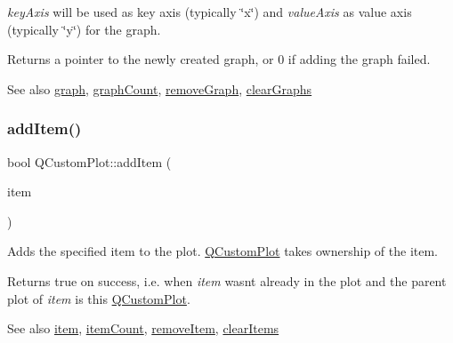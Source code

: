 {\itshape key\+Axis} will be used as key axis (typically \char`\"{}x\char`\"{}) and {\itshape value\+Axis} as value axis (typically \char`\"{}y\char`\"{}) for the graph.

Returns a pointer to the newly created graph, or 0 if adding the graph failed.

\begin{DoxySeeAlso}{See also}
\hyperlink{class_q_custom_plot_a6ecae130f684b25276fb47bd3a5875c6}{graph}, \hyperlink{class_q_custom_plot_a5e1787cdde868c4d3790f9ebc8207d90}{graph\+Count}, \hyperlink{class_q_custom_plot_a903561be895fb6528a770d66ac5e6713}{remove\+Graph}, \hyperlink{class_q_custom_plot_ab0f3abff2d2f7df3668b5836f39207fa}{clear\+Graphs} 
\end{DoxySeeAlso}
\hypertarget{class_q_custom_plot_aa500620379262321685cb7a7674cbd2a}{}\label{class_q_custom_plot_aa500620379262321685cb7a7674cbd2a} 
\subsubsection{\texorpdfstring{add\+Item()}{addItem()}}
{\footnotesize\ttfamily bool Q\+Custom\+Plot\+::add\+Item (\begin{DoxyParamCaption}\item[{\hyperlink{class_q_c_p_abstract_item}{Q\+C\+P\+Abstract\+Item} $\ast$}]{item }\end{DoxyParamCaption})}

Adds the specified item to the plot. \hyperlink{class_q_custom_plot}{Q\+Custom\+Plot} takes ownership of the item.

Returns true on success, i.\+e. when {\itshape item} wasn\textquotesingle{}t already in the plot and the parent plot of {\itshape item} is this \hyperlink{class_q_custom_plot}{Q\+Custom\+Plot}.

\begin{DoxySeeAlso}{See also}
\hyperlink{class_q_custom_plot_ac042f2e78edd228ccf2f26b7fe215239}{item}, \hyperlink{class_q_custom_plot_a16025daf0341f9362be3080e404424c2}{item\+Count}, \hyperlink{class_q_custom_plot_ae04446557292551e8fb6e2c106e1848d}{remove\+Item}, \hyperlink{class_q_custom_plot_abdfd07d4f0591d0cf967f85013fd3645}{clear\+Items} 
\end{DoxySeeAlso}
\hypertarget{class_q_custom_plot_ad5255393df078448bb6ac83fa5db5f52}{}\label{class_q_custom_plot_ad5255393df078448bb6ac83fa5db5f52} 
